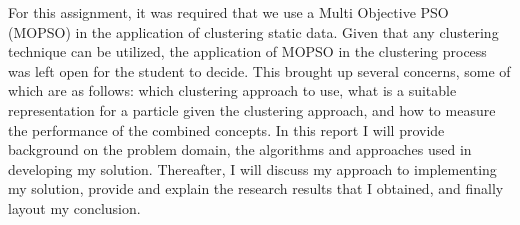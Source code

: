 \begin{flushleft}
    For this assignment, it was required that we use a Multi Objective PSO (MOPSO) 
    in the application of clustering static data. Given that any clustering technique 
    can be utilized, the application of MOPSO in the clustering process was left open 
    for the student to decide. This brought up several concerns, some of which are as follows: 
    which clustering approach to use, what is a suitable representation for a particle 
    given the clustering approach, and how to measure the performance of the combined 
    concepts. In this report I will provide background on the problem domain, the 
    algorithms and approaches used in developing my solution. Thereafter, I will 
    discuss my approach to implementing my solution, provide and explain the research 
    results that I obtained, and finally layout my conclusion.
\end{flushleft}